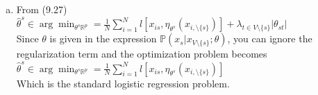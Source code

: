 \documentclass[11pt]{article}
\begin{document}
\begin{enumerate}[a)]

\item
From (9.27)\\
$\hat{\theta}^s \in \arg \min_{\theta^s \mathbb{R}^p} = \frac{1}{N} \sum_{i=1}^N l[x_{is}, \eta_{\theta^s}(x_{i, \setminus \{s\} })] + \lambda_{t \in V\setminus \{s\}} |\theta_{st}|$\\
Since $\theta$ is given in the expression $\mathbb{P}(x_s | x_{V \setminus \{s\}}; \theta)$, you can ignore the regularization term and the optimization problem becomes\\
$\hat{\theta}^s \in \arg \min_{\theta^s \mathbb{R}^p} = \frac{1}{N} \sum_{i=1}^N l[x_{is}, \eta_{\theta^s}(x_{i, \setminus \{s\} })]$\\
Which is the standard logistic regression problem.


\end{enumerate}
\end{document}
